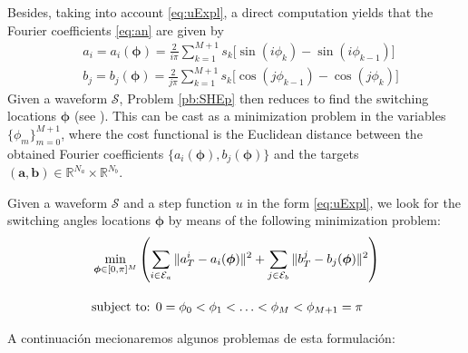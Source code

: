 Besides, taking into account \eqref{eq:uExpl}, a direct computation yields that the Fourier coefficients \eqref{eq:an} are given by
\begin{align*}
	& a_i = a_i(\bm{\phi}) =  \frac{2}{i\pi} \sum_{k=1}^{M+1} s_k \Big[\sin(i\phi_k) -\sin(i\phi_{k-1})\Big]
	\\
	& b_j = b_j(\bm{\phi}) = \frac{2}{j\pi} \sum_{k=1}^{M+1} s_k \Big[\cos(j\phi_{k-1}) -\cos(j\phi_{k})\Big]
\end{align*}
Given a waveform $\mathcal S$, Problem \ref{pb:SHEp} then reduces to find the switching locations $\bm{\phi}$ (see \cite{Yang2015,Konstantinou2010,Sun1996}). This can be cast as a minimization problem in the variables $\{\phi_m\}_{m=0}^{M+1}$, where the cost functional is the Euclidean distance between the obtained Fourier coefficients $\{a_i(\bm{\phi}),b_j(\bm{\phi})\}$ and the targets $(\bm{a},\bm{b})\in \mathbb{R}^{N_a}\times \mathbb{R}^{N_b}$.
\newline
\begin{problem}
Given a waveform $\mathcal S$ and a step function $u$ in the form \eqref{eq:uExpl}, we look for the switching angles locations $\bm{\phi}$ by means of the following minimization problem:
\begin{align}
	&\min_{\bm{\phi} \in [0,\pi]^{M}} \left(\sum_{i\in\mathcal{E}_a} \|a_T^i - a_i(\bm{\phi})\|^2 + \sum_{j\in \mathcal{E}_b} \|b_T^j - b_j(\bm{\phi})\|^2\right)\notag 
	\\[10pt]
	&\mbox{subject to: } 0 = \phi_0 <\phi_1 < \ldots < \phi_{M} < \phi_{M+1} = \pi \notag 
\end{align}
\end{problem}
A continuación mecionaremos algunos problemas de esta formulación:
